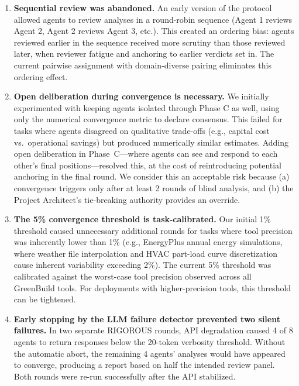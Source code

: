 \documentclass[11pt,a4paper]{article}
\begin{document}
\begin{enumerate}
    \item \textbf{Sequential review was abandoned.} An early version of the protocol allowed agents to review analyses in a round-robin sequence (Agent 1 reviews Agent 2, Agent 2 reviews Agent 3, etc.). This created an ordering bias: agents reviewed earlier in the sequence received more scrutiny than those reviewed later, when reviewer fatigue and anchoring to earlier verdicts set in. The current pairwise assignment with domain-diverse pairing eliminates this ordering effect.
    \item \textbf{Open deliberation during convergence is necessary.} We initially experimented with keeping agents isolated through Phase C as well, using only the numerical convergence metric to declare consensus. This failed for tasks where agents disagreed on qualitative trade-offs (e.g., capital cost vs.\ operational savings) but produced numerically similar estimates. Adding open deliberation in Phase~C---where agents can see and respond to each other's final positions---resolved this, at the cost of reintroducing potential anchoring in the final round. We consider this an acceptable risk because (a) convergence triggers only after at least 2 rounds of blind analysis, and (b) the Project Architect's tie-breaking authority provides an override.
    \item \textbf{The 5\% convergence threshold is task-calibrated.} Our initial 1\% threshold caused unnecessary additional rounds for tasks where tool precision was inherently lower than 1\% (e.g., EnergyPlus annual energy simulations, where weather file interpolation and HVAC part-load curve discretization cause inherent variability exceeding 2\%). The current 5\% threshold was calibrated against the worst-case tool precision observed across all GreenBuild tools. For deployments with higher-precision tools, this threshold can be tightened.
    \item \textbf{Early stopping by the LLM failure detector prevented two silent failures.} In two separate RIGOROUS rounds, API degradation caused 4 of 8 agents to return responses below the 20-token verbosity threshold. Without the automatic abort, the remaining 4 agents' analyses would have appeared to converge, producing a report based on half the intended review panel. Both rounds were re-run successfully after the API stabilized.
\end{enumerate}

\end{document}
